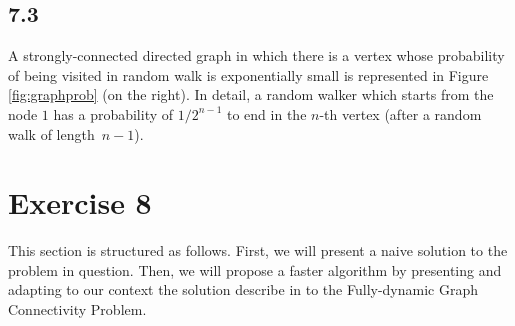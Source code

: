 \documentclass[12pt,a4paper]{article}
\begin{document}
\subsection*{7.3}

A strongly-connected directed graph in which there is a vertex whose probability of being visited in random walk is exponentially small is represented in Figure \ref{fig:graphprob} (on the right). In detail, a random walker which starts from the node $1$ has a probability of $1/2^{n - 1}$ to end in the $n$-th vertex (after a random walk of length~$n - 1$).



\section*{Exercise 8}

This section is structured as follows. First, we will present a naive solution to the problem in question. Then, we will propose a faster algorithm by presenting and adapting to our context the solution describe in \cite{holm2001poly} to the Fully-dynamic Graph Connectivity Problem.
\end{document}
